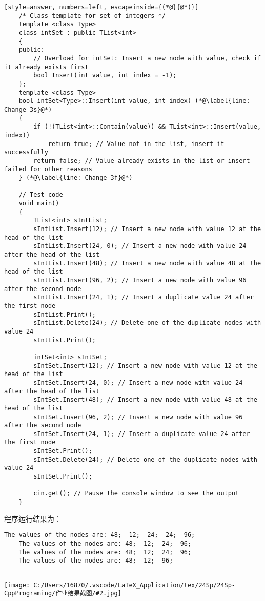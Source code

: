 \documentclass[10pt, a4paper, oneside, fontset=none]{ctexart}
\theoremstyle{plain}
\theoremstyle{definition}
\newcommand{\prtsc}[2][14]{\begin{center}
	\texttt{[image: C:/Users/16870/.vscode/LaTeX\_Application/tex/24Sp/24Sp-CppPrograming/作业结果截图/\#2.jpg]}
	\vspace{-1em}
\end{center}}
\begin{document}
\begin{lstlisting}[style=answer, numbers=left, escapeinside={(*@}{@*)}]
	/* Class template for set of integers */
	template <class Type>
	class intSet : public TList<int>
	{
	public:
		// Overload for intSet: Insert a new node with value, check if it already exists first
		bool Insert(int value, int index = -1);
	};
	template <class Type>
	bool intSet<Type>::Insert(int value, int index) (*@\label{line: Change 3s}@*)
	{
		if (!(TList<int>::Contain(value)) && TList<int>::Insert(value, index))
			return true; // Value not in the list, insert it successfully
		return false; // Value already exists in the list or insert failed for other reasons
	} (*@\label{line: Change 3f}@*)
	
	// Test code
	void main()
	{
		TList<int> sIntList;
		sIntList.Insert(12); // Insert a new node with value 12 at the head of the list
		sIntList.Insert(24, 0); // Insert a new node with value 24 after the head of the list
		sIntList.Insert(48); // Insert a new node with value 48 at the head of the list
		sIntList.Insert(96, 2); // Insert a new node with value 96 after the second node
		sIntList.Insert(24, 1); // Insert a duplicate value 24 after the first node
		sIntList.Print();
		sIntList.Delete(24); // Delete one of the duplicate nodes with value 24
		sIntList.Print();
	
		intSet<int> sIntSet;
		sIntSet.Insert(12); // Insert a new node with value 12 at the head of the list
		sIntSet.Insert(24, 0); // Insert a new node with value 24 after the head of the list
		sIntSet.Insert(48); // Insert a new node with value 48 at the head of the list
		sIntSet.Insert(96, 2); // Insert a new node with value 96 after the second node
		sIntSet.Insert(24, 1); // Insert a duplicate value 24 after the first node
		sIntSet.Print();
		sIntSet.Delete(24); // Delete one of the duplicate nodes with value 24
		sIntSet.Print();
	
		cin.get(); // Pause the console window to see the output
	}
\end{lstlisting}
程序运行结果为：
\begin{lstlisting}[style=output]
	The values of the nodes are: 48;  12;  24;  24;  96;
	The values of the nodes are: 48;  12;  24;  96;
	The values of the nodes are: 48;  12;  24;  96;
	The values of the nodes are: 48;  12;  96;
	 
\end{lstlisting}
\prtsc{12-03}


\end{document}

